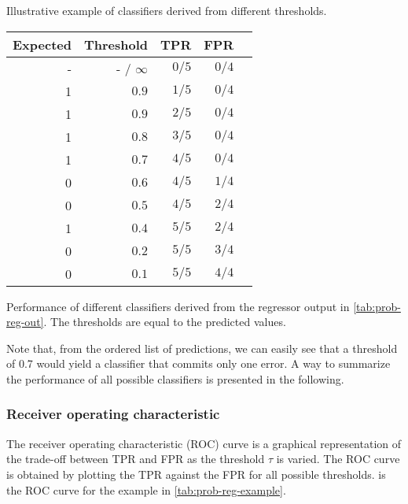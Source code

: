 \begin{tablebox}[label=tab:prob-reg-example]{Illustrative example of classifiers derived
  from different thresholds.}
  \centering
  \begin{tabular}{rrrrr}
    \toprule
    \textbf{Expected} & \textbf{Threshold} & \textbf{TPR} & \textbf{FPR}  \\
    \midrule
    - & - / $\infty$ & $0/5$ & $0/4$ \\
    1 & $0.9$        & $1/5$ & $0/4$ \\
    1 & $0.9$        & $2/5$ & $0/4$ \\
    1 & $0.8$        & $3/5$ & $0/4$ \\
    1 & $0.7$        & $4/5$ & $0/4$ \\
    0 & $0.6$        & $4/5$ & $1/4$ \\
    0 & $0.5$        & $4/5$ & $2/4$ \\
    1 & $0.4$        & $5/5$ & $2/4$ \\
    0 & $0.2$        & $5/5$ & $3/4$ \\
    0 & $0.1$        & $5/5$ & $4/4$ \\
    \bottomrule
  \end{tabular}
  \tcblower
  Performance of different classifiers derived from the regressor output in
  \cref{tab:prob-reg-out}.  The thresholds are equal to the predicted values.
\end{tablebox}

Note that, from the ordered list of predictions, we can easily see that a threshold of 0.7
would yield a classifier that commits only one error.  A way to summarize the performance
of all possible classifiers is presented in the following.

\subsubsection{Receiver operating characteristic}

The receiver operating characteristic (ROC) curve is a graphical representation of the
trade-off between TPR and FPR as the threshold
$\tau$ is varied.  The ROC curve is obtained by plotting the TPR against the FPR for all
possible thresholds.   is the ROC curve for the example in
\cref{tab:prob-reg-example}.

